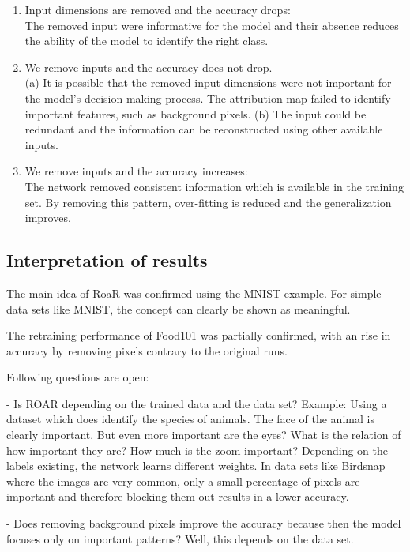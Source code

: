 \begin{enumerate}
	\item Input dimensions are removed and the accuracy drops:\\ The removed input were informative for the model and
	their absence reduces the ability of the model to identify the right class.
	
	\item We remove inputs and the accuracy does not drop.\\ (a) It is possible that the removed input dimensions	were not important for the model’s decision-making	process. The attribution map failed to identify important features, such as background pixels. (b) The input could be redundant and the information can be reconstructed using other available inputs. 
	
	\item We remove inputs and the accuracy increases:\\ The network removed consistent information which is available in the training set. By removing this pattern, over-fitting is reduced and the generalization improves.
\end{enumerate}


\subsection{Interpretation of results}

The main idea of RoaR was confirmed using the MNIST example. For simple data sets like MNIST, the concept can clearly be shown as meaningful.

The retraining performance of Food101 was partially confirmed, with an rise in accuracy by removing pixels contrary to the original runs.

Following questions are open:

- Is ROAR depending on the trained data and the data set? Example: Using a dataset which does identify the species of animals. The face of the animal is clearly important. But even more important are the eyes? What is the relation of how important they are? How much is the zoom important? Depending on the labels existing, the network learns different weights. In data sets like Birdsnap where the images are very common, only a small percentage of pixels are important and therefore blocking them out results in a lower accuracy.


- Does removing background pixels improve the accuracy because then the model focuses only on important patterns?
Well, this depends on the data set.

